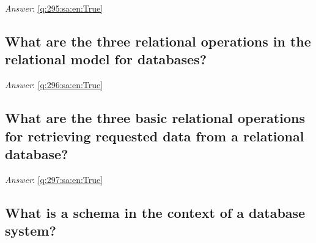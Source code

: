 \documentclass[a4paper,11pt,oneside]{article}
\begin{document}
\begin{sloppypar}
\label{q:295:sa:en:False}

\vspace{2cm}

\noindent\makebox[\textwidth]{\hrulefill}

\vspace{1cm}

\textit{Answer}: \autoref{q:295:sa:en:True}



\subsection{What are the three relational operations in the relational model for databases?}

\label{q:296:sa:en:False}

\vspace{2cm}

\noindent\makebox[\textwidth]{\hrulefill}

\vspace{1cm}

\textit{Answer}: \autoref{q:296:sa:en:True}



\subsection{What are the three basic relational operations for retrieving requested data from a relational database?}

\label{q:297:sa:en:False}

\vspace{2cm}

\noindent\makebox[\textwidth]{\hrulefill}

\vspace{1cm}

\textit{Answer}: \autoref{q:297:sa:en:True}



\subsection{What is a schema in the context of a database system?}

\label{q:298:sa:en:False}

\vspace{2cm}

\noindent\makebox[\textwidth]{\hrulefill}

\vspace{1cm}


\end{sloppypar}
\end{document}
